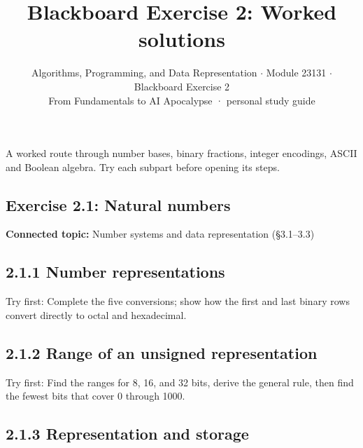 \documentclass[11pt]{article}
\title{\sffamily\bfseries\color{FAUblue}Blackboard Exercise 2: Worked solutions}
\author{Algorithms, Programming, and Data Representation \ensuremath{\cdot} Module 23131 \ensuremath{\cdot} Blackboard Exercise 2\\[2pt]\small From Fundamentals to AI Apocalypse · personal study guide}
\date{}
\begin{document}
\maketitle
\begingroup\footnotesize\setlength{\parskip}{0pt}\tableofcontents\endgroup
\clearpage

{\large A worked route through number bases, binary fractions, integer encodings, ASCII and Boolean algebra. Try each subpart before opening its steps.}


\begin{keepsection}
\section{Exercise 2.1: Natural numbers}

\textbf{Connected topic:} Number systems and data representation (§3.1–3.3)

\begin{keepsection}
\subsection{2.1.1 Number representations}

Try first: Complete the five conversions; show how the first and last binary rows convert directly to octal and hexadecimal.

\end{keepsection}

\begin{keepsection}
\subsection{2.1.2 Range of an unsigned representation}

Try first: Find the ranges for 8, 16, and 32 bits, derive the general rule, then find the fewest bits that cover 0 through 1000.

\end{keepsection}

\begin{keepsection}
\subsection{2.1.3 Representation and storage}


\end{keepsection}
\end{keepsection}
\end{document}
